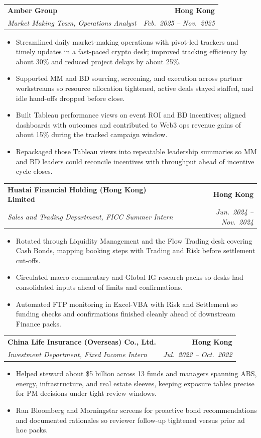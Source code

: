 \documentclass[9pt,a4paper]{extarticle}
\makeatletter
\newcommand{\resumeSubheading}[4]{%
  \vspace{0.6em}%
  \begin{tabular*}{\textwidth}{l@{\extracolsep{\fill}}r}
    \textbf{#1} & \textbf{#2} \\
    \textit{\small #3} & \textit{\small #4} \\
  \end{tabular*}\vspace{0.32em}}
\makeatother
\begin{document}
\resumeSubheading{Amber Group}{Hong Kong}{Market Making Team, Operations Analyst}{Feb.\ 2025 -- Nov.\ 2025}
\begin{itemize}
  \item Streamlined daily market-making operations with pivot-led trackers and timely updates in a fast-paced crypto desk; improved tracking efficiency by about 30\% and reduced project delays by about 25\%.
  \item Supported MM and BD sourcing, screening, and execution across partner workstreams so resource allocation tightened, active deals stayed staffed, and idle hand-offs dropped before close.
  \item Built Tableau performance views on event ROI and BD incentives; aligned dashboards with outcomes and contributed to Web3 ops revenue gains of about 15\% during the tracked campaign window.
  \item Repackaged those Tableau views into repeatable leadership summaries so MM and BD leaders could reconcile incentives with throughput ahead of incentive cycle closes.
\end{itemize}

\resumeSubheading{Huatai Financial Holding (Hong Kong) Limited}{Hong Kong}{Sales and Trading Department, FICC Summer Intern}{Jun.\ 2024 -- Nov.\ 2024}
\begin{itemize}
  \item Rotated through Liquidity Management and the Flow Trading desk covering Cash Bonds, mapping booking steps with Trading and Risk before settlement cut-offs.
  \item Circulated macro commentary and Global IG research packs so desks had consolidated inputs ahead of limits and confirmations.
  \item Automated FTP monitoring in Excel-VBA with Risk and Settlement so funding checks and confirmations finished cleanly ahead of downstream Finance packs.
\end{itemize}

\resumeSubheading{China Life Insurance (Overseas) Co., Ltd.}{Hong Kong}{Investment Department, Fixed Income Intern}{Jul.\ 2022 -- Oct.\ 2022}
\begin{itemize}
  \item Helped steward about \$5 billion across 13 funds and managers spanning ABS, energy, infrastructure, and real estate sleeves, keeping exposure tables precise for PM decisions under tight review windows.
  \item Ran Bloomberg and Morningstar screens for proactive bond recommendations and documented rationales so reviewer follow-up tightened versus prior ad hoc packs.
\end{itemize}
\end{document}
